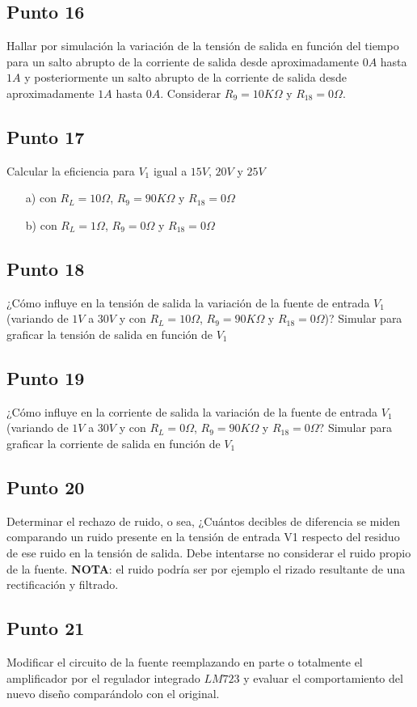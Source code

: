 \subsection{Punto 16}

Hallar por simulación la variación de la tensión de salida en función del tiempo para un salto abrupto de la corriente de salida desde aproximadamente $0 A$ hasta $ 1A$ y posteriormente un salto abrupto de la corriente de salida desde aproximadamente $ 1A$ hasta $0 A$. Considerar $R_{9} = 10 K\Omega$ y $R_{18} = 0 \Omega$.


\subsection{Punto 17}

Calcular la eficiencia para $V_{1}$ igual a $15 V$, $20 V$ y $25 V$ 

\begin{enumerate}
\item[a)] con $R_{L} = 10 \Omega$, $R_{9} = 90 K\Omega$ y $R_{18} = 0 \Omega$
\item[b)] con $R_{L} = 1 \Omega$, $R_{9} = 0 \Omega$ y $R_{18} = 0 \Omega$
\end{enumerate}


\subsection{Punto 18}

¿Cómo influye en la tensión de salida la variación de la fuente de entrada $V_{1}$ (variando de $1 V$ a $30 V$ y con $R_{L} = 10 \Omega$, $R_{9} = 90 K\Omega$ y $R_{18} = 0 \Omega$)? Simular para graficar la tensión de salida en función de $V_{1}$


\subsection{Punto 19}

¿Cómo influye en la corriente de salida la variación de la fuente de entrada $V_{1}$ (variando de $1 V$ a $30 V$ y con $R_{L} = 0 \Omega$, $R_{9} = 90 K\Omega$ y $R_{18} = 0 \Omega$? Simular para graficar la corriente de salida en función de $V_{1}$


\subsection{Punto 20}

Determinar el rechazo de ruido, o sea, ¿Cuántos decibles de diferencia se miden comparando un ruido presente en la tensión de entrada V1 respecto del residuo de ese ruido en la tensión de salida. Debe intentarse no considerar el ruido propio de la fuente. \textbf{NOTA}: el ruido podría ser por ejemplo el rizado resultante de una rectificación y filtrado.


\subsection{Punto 21}

Modificar el circuito de la fuente reemplazando en parte o totalmente el amplificador por el regulador integrado $LM723$ y evaluar el comportamiento del nuevo diseño comparándolo con el original.




